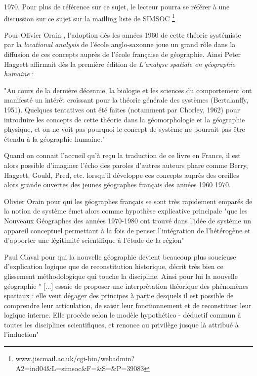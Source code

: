 1970. Pour plus de référence sur ce sujet, le lecteur pourra se référer à une discussion sur ce sujet sur la mailling liste de SIMSOC \footnote {www.jiscmail.ac.uk/cgi-bin/webadmin?A2=ind04\&L=simsoc\&F=\&S=\&P=39083}


Pour Olivier Orain \autocite[26]{Orain2001}, l’adoption dès les années 1960 de cette théorie systémiste par la \textit{locational analysis} de l'école anglo-saxonne joue un grand rôle dans la diffusion de ces concepts auprès de l'école française de géographie. Ainsi Peter Haggett affirmait dès la première édition de \textit{L’analyse spatiale en géographie humaine} :

"Au cours de la dernière décennie, la biologie et les sciences du comportement ont manifesté un intérêt croissant pour la théorie générale des systèmes (Bertalanffy, 1951). Quelques tentatives ont été faites (notamment par Chorley, 1962) pour introduire les concepts de cette théorie dans la géomorphologie et la géographie physique, et on ne voit pas pourquoi le concept de système ne pourrait pas être étendu à la géographie humaine." \autocite{Haggett1965}

Quand on connait l'accueil qu'à reçu la traduction de ce livre en France, il est alors possible d'imaginer l'écho des paroles d'autres auteurs phare comme Berry, Haggett, Gould, Pred, etc. lorsqu'il développe ces concepts auprès des oreilles alors grande ouvertes des jeunes géographes français des années 1960 1970. \autocite[26]{Orain2001}

Olivier Orain pour qui les géographes français se sont très rapidement emparés de la notion de système émet alors comme hypothèse explicative principale "que les Nouveaux Géographes des années 1970-1980 ont trouvé dans l’idée de système un appareil conceptuel permettant à la fois de penser l’intégration de l’hétérogène et d’apporter une légitimité scientifique à l’étude de la région" \autocite[23]{Orain2001} 


\autocite{Batty1976} Paul Claval pour qui la nouvelle géographie devient beaucoup plus soucieuse d'explication logique que de reconstitution historique, décrit très bien ce glissement méthodologique qui touche la discipline. Ainsi pour lui la nouvelle géographie " [...] essaie de proposer une interprétation théorique des phénomènes spatiaux : elle veut dégager des principes à partie desquels il est possible de comprendre leur articulation, de saisir leur fonctionnement et de reconstituer leur logique interne. Elle procède selon le modèle hypothético - déductif commun à toutes les disciplines scientifiques, et renonce au privilège jusque là attribué à l'induction" \autocite[p22]{Claval1977}

